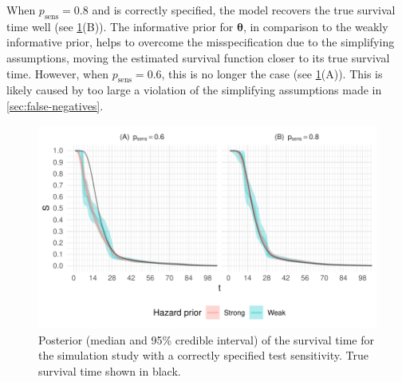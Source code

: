 \documentclass[12pt]{article}
\renewcommand{\vec}[1]{\bm{#1}}
\newcommand{\psens}{p_\text{sens}}
\begin{document}
When $\psens = 0.8$ and is correctly specified, the model recovers the true survival time well (see \cref{imperf-test:fig:constant-test-sensitivity}(B)).
The informative prior for $\vec\theta$, in comparison to the weakly informative prior, helps to overcome the misspecification due to the simplifying assumptions, moving the estimated survival function closer to its true survival time.
However, when $\psens = 0.6$, this is no longer the case (see \cref{imperf-test:fig:constant-test-sensitivity}(A)).
This is likely caused by too large a violation of the simplifying assumptions made in \cref{sec:false-negatives}.
\begin{figure}
  \includegraphics[width=\textwidth]{figures/output/sim-constant-sensitivity}
  \caption[Simulation study results with constant test sensitivity]{%
    Posterior (median and 95\% credible interval) of the survival time for the simulation study with a correctly specified test sensitivity.
    True survival time shown in black.
  }
  \label{imperf-test:fig:constant-test-sensitivity}
\end{figure}
\end{document}
